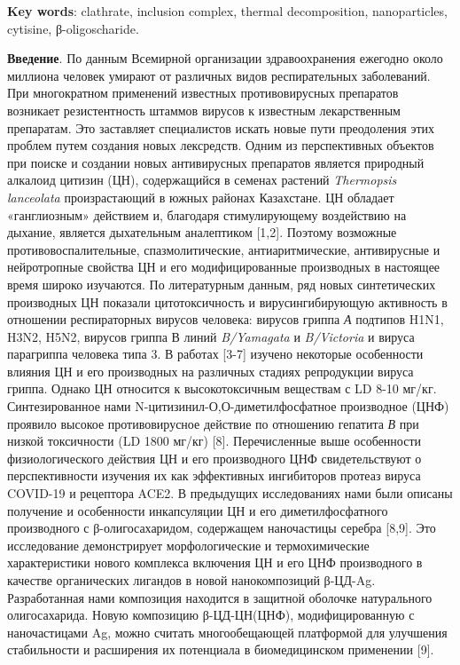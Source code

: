 {\bfseries Key words}: clathrate, inclusion complex, thermal decomposition,
nanoparticles, cytisine, β-oligoscharide.

{\bfseries Введение}. По данным Всемирной организации здравоохранения
ежегодно около миллиона человек умирают от различных видов
респирательных заболеваний. При многократном применений известных
противовирусных препаратов возникает резистентность штаммов вирусов к
известным лекарственным препаратам. Это заставляет специалистов искать
новые пути преодоления этих проблем путем создания новых лексредств.
Одним из перспективных объектов при поиске и создании новых антивирусных
препаратов является природный алкалоид цитизин (ЦН), содержащийся в
семенах растений \emph{Thermopsis lanceolata} произрастающий в южных
районах Казахстане. ЦН обладает «ганглиозным» действием и, благодаря
стимулирующему воздействию на дыхание, является дыхательным аналептиком
{[}1,2{]}. Поэтому возможные противовоспалительные, спазмолитические,
антиаритмические, антивирусные и нейротропные свойства ЦН и его
модифицированные производных в настоящее время широко изучаются. По
литературным данным, ряд новых синтетических производных ЦН показали
цитотоксичность и вирусингибирующую активность в отношении респираторных
вирусов человека: вирусов гриппа \emph{А} подтипов H1N1, H3N2, H5N2,
вирусов гриппа В линий \emph{B/Yamagata} и \emph{B/Victoria} и вируса
парагриппа человека типа 3. В работах {[}3-7{]} изучено некоторые
особенности влияния ЦН и его производных на различных стадиях
репродукции вируса гриппа. Однако ЦН относится к высокотоксичным
веществам с LD 8-10 мг/кг. Синтезированное нами
N-цитизинил-О,О-диметилфосфатное производное (ЦНФ) проявило высокое
противовирусное действие по отношению гепатита \emph{В} при низкой
токсичности (LD 1800 мг/кг) {[}8{]}. Перечисленные
выше особенности физиологического действия ЦН и его производного ЦНФ
свидетельствуют о перспективности изучения их как эффективных
ингибиторов протеаз вируса COVID-19 и рецептора ACE2. В предыдущих
исследованиях нами были описаны получение и особенности инкапсуляции ЦН
и его диметилфосфатного производного с β-олигосахаридом, содержащем
наночастицы серебра {[}8,9{]}. Это исследование демонстрирует
морфологические и термохимические характеристики нового комплекса
включения ЦН и его ЦНФ производного в качестве органических лигандов в
новой нанокомпозиций β-ЦД-Ag. Разработанная нами композиция находится в
защитной оболочке натурального олигосахарида. Новую композицию
β-ЦД-ЦН(ЦНФ), модифицированную с наночастицами Ag, можно считать
многообещающей платформой для улучшения стабильности и расширения их
потенциала в биомедицинском применении {[}9{]}.

